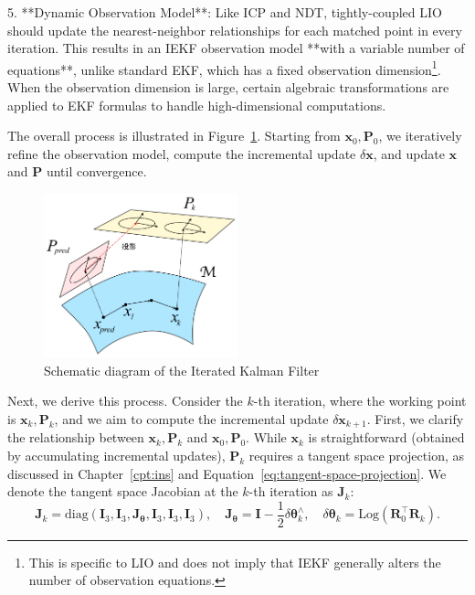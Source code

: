 5. **Dynamic Observation Model**: Like ICP and NDT, tightly-coupled LIO should update the nearest-neighbor relationships for each matched point in every iteration. This results in an IEKF observation model **with a variable number of equations**, unlike standard EKF, which has a fixed observation dimension\footnote{This is specific to LIO and does not imply that IEKF generally alters the number of observation equations.}. When the observation dimension is large, certain algebraic transformations are applied to EKF formulas to handle high-dimensional computations.  

The overall process is illustrated in Figure~\ref{fig:iekf-iters}. Starting from \(\mathbf{x}_0, \mathbf{P}_0\), we iteratively refine the observation model, compute the incremental update \(\delta \mathbf{x}\), and update \(\mathbf{x}\) and \(\mathbf{P}\) until convergence.  

\begin{figure}[!htp]  
	\centering  
	\includegraphics[width=0.5\textwidth]{resources/lio/iekf-iters.pdf}  
	\caption{Schematic diagram of the Iterated Kalman Filter}  
	\label{fig:iekf-iters}  
\end{figure}  

Next, we derive this process. Consider the \(k\)-th iteration, where the working point is \(\mathbf{x}_{k}, \mathbf{P}_{k}\), and we aim to compute the incremental update \(\delta \mathbf{x}_{k+1}\). First, we clarify the relationship between \(\mathbf{x}_{k}, \mathbf{P}_{k}\) and \(\mathbf{x}_0, \mathbf{P}_0\). While \(\mathbf{x}_{k}\) is straightforward (obtained by accumulating incremental updates), \(\mathbf{P}_{k}\) requires a tangent space projection, as discussed in Chapter~\ref{cpt:ins} and Equation~\eqref{eq:tangent-space-projection}. We denote the tangent space Jacobian at the \(k\)-th iteration as \(\mathbf{J}_k\):  
\begin{equation}\label{key}  
	\mathbf{J}_k = \mathrm{diag}(\mathbf{I}_3, \mathbf{I}_3, \mathbf{J}_{\boldsymbol{\theta}}, \mathbf{I}_3, \mathbf{I}_3, \mathbf{I}_3), \quad \mathbf{J}_{\boldsymbol{\theta}} = \mathbf{I} - \frac{1}{2} \delta \boldsymbol{\theta}_k^\wedge, \quad \delta \boldsymbol{\theta}_k = \mathrm{Log}(\mathbf{R}_0^\top \mathbf{R}_k).  
\end{equation}  

